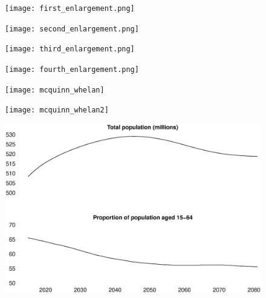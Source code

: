 \documentclass{beamer}
\begin{document}
\begin{frame}
  \begin{figure}
    \texttt{[image: first\_enlargement.png]}
  \end{figure}
\end{frame}

\begin{frame}
  \begin{figure}
    \texttt{[image: second\_enlargement.png]}
  \end{figure}
\end{frame}

\begin{frame}
  \begin{figure}
    \texttt{[image: third\_enlargement.png]}
  \end{figure}
\end{frame}

\begin{frame}
  \begin{figure}
    \texttt{[image: fourth\_enlargement.png]}
  \end{figure}
\end{frame}

\begin{frame}
  \begin{figure}
    \texttt{[image: mcquinn\_whelan]}
  \end{figure}
\end{frame}

\begin{frame}
  \begin{figure}
    \texttt{[image: mcquinn\_whelan2]}
  \end{figure}
\end{frame}

\begin{frame}
  \begin{figure}
    \includegraphics[scale=.3]{population}
  \end{figure}
\end{frame}
\end{document}
